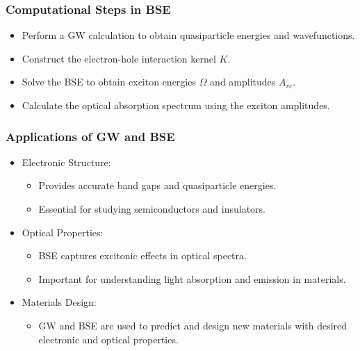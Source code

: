 \documentclass{CustomBeamer}
\begin{document}
        \begin{frame}
        \frametitle{Computational Steps in BSE}
        \begin{itemize}
            \item Perform a GW calculation to obtain quasiparticle energies and wavefunctions.
            \item Construct the electron-hole interaction kernel $K$.
            \item Solve the BSE to obtain exciton energies $\Omega$ and amplitudes $A_{vc}$.
            \item Calculate the optical absorption spectrum using the exciton amplitudes.
        \end{itemize}
        \end{frame}
        
        \begin{frame}
        \frametitle{Applications of GW and BSE}
        \begin{itemize}
            \item Electronic Structure:
            \begin{itemize}
                \item Provides accurate band gaps and quasiparticle energies.
                \item Essential for studying semiconductors and insulators.
            \end{itemize}
            \item Optical Properties:
            \begin{itemize}
                \item BSE captures excitonic effects in optical spectra.
                \item Important for understanding light absorption and emission in materials.
            \end{itemize}
            \item Materials Design:
            \begin{itemize}
                \item GW and BSE are used to predict and design new materials with desired electronic and optical properties.
            \end{itemize}
        \end{itemize}
        \end{frame}
        
\end{document}
